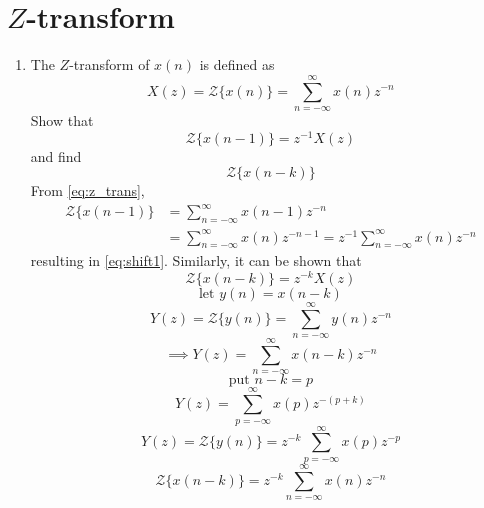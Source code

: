 \documentclass[journal,12pt,twocolumn]{IEEEtran}
\renewcommand\thesection{\arabic{section}}
\begin{document}
\section{$Z$-transform}
\begin{enumerate}[label=\thesection.\arabic*]
\item The $Z$-transform of $x(n)$ is defined as
%
\begin{equation}
	\label{eq:z_trans}
	X(z)={\mathcal {Z}}\{x(n)\}=\sum _{n=-\infty }^{\infty }x(n)z^{-n}
\end{equation}
%
Show that
\begin{equation}
	\label{eq:shift1}
	{\mathcal {Z}}\{x(n-1)\} = z^{-1}X(z)
\end{equation}
and find
\begin{equation}
	{\mathcal {Z}}\{x(n-k)\} 
\end{equation}
\solution From \eqref{eq:z_trans},
\begin{align}
	{\mathcal {Z}}\{x(n-1)\} &=\sum _{n=-\infty }^{\infty }x(n-1)z^{-n}
	\\
	&=\sum _{n=-\infty }^{\infty }x(n)z^{-n-1} = z^{-1}\sum _{n=-\infty }^{\infty }x(n)z^{-n}
\end{align}
resulting in \eqref{eq:shift1}. Similarly, it can be shown that
%
\begin{equation}
	\label{eq:z_trans_shift}
	{\mathcal {Z}}\{x(n-k)\} = z^{-k}X(z)
\end{equation}
\begin{equation}
	\text{let } y(n) = x(n-k)
\end{equation}
\begin{equation}
	Y(z) = {\mathcal {Z}}\{y(n)\} = \sum_{n=-\infty}^{\infty}y(n)z^{-n}
\end{equation}
\begin{equation}
	\implies Y(z) = \sum_{n=-\infty}^{\infty}x(n-k)z^{-n}
\end{equation}
\begin{equation}
	\text{put }n-k = p
\end{equation}
\begin{equation}
	Y(z) = \sum_{p=-\infty}^{\infty}x(p)z^{-(p+k)}
\end{equation}
\begin{equation}
	Y(z) = {\mathcal {Z}}\{y(n)\} = z^{-k}\sum_{p=-\infty}^{\infty}x(p)z^{-p}
\end{equation}
\begin{equation}
	{\mathcal{Z}}\{x(n-k)\} = z^{-k}\sum_{n=-\infty}^{\infty}x(n)z^{-n}
\end{equation}

\end{enumerate}
\end{document}
